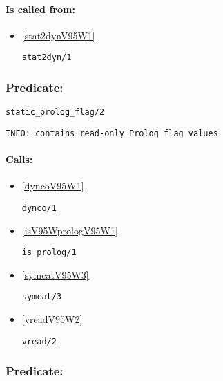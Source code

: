\paragraph{Is called from:} 
\begin{itemize}
\item \ref{stat2dynV95W1} 
\begin{verbatim}
stat2dyn/1
\end{verbatim}

\end{itemize}

\subsubsection{Predicate:} \label{staticV95WprologV95WflagV95W2}

\begin{verbatim}
static_prolog_flag/2
\end{verbatim}

{\small \begin{verbatim}
INFO: contains read-only Prolog flag values

\end{verbatim}}
\paragraph{Calls:} 
\begin{itemize}
\item \ref{dyncoV95W1} 
\begin{verbatim}
dynco/1
\end{verbatim}

\item \ref{isV95WprologV95W1} 
\begin{verbatim}
is_prolog/1
\end{verbatim}

\item \ref{symcatV95W3} 
\begin{verbatim}
symcat/3
\end{verbatim}

\item \ref{vreadV95W2} 
\begin{verbatim}
vread/2
\end{verbatim}

\end{itemize}

\subsubsection{Predicate:} \label{statisticsV95W0}

